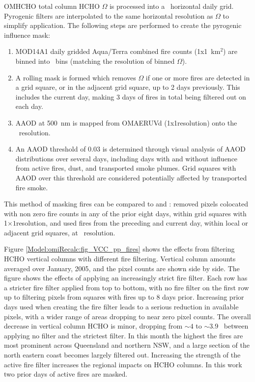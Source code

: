     OMHCHO total column HCHO $\Omega$ is processed into a \highhr ~horizontal daily grid.
    Pyrogenic filters are interpolated to the same horizontal resolution as $\Omega$ to simplify application. 
    The following steps are performed to create the pyrogenic influence mask:
    \begin{enumerate}
      \item MOD14A1 daily gridded Aqua/Terra combined fire counts (1x1~km$^2$) are binned into \highhr ~bins (matching the resolution of binned $\Omega$).
      \item A rolling mask is formed which removes $\Omega$ if one or more fires are detected in a grid square, or in the adjacent grid square, up to 2 days previously.
      This includes the current day, making 3 days of fires in total being filtered out on each day.
      \item AAOD at 500~nm is mapped from OMAERUVd (1x1\degr resolution) onto the \highhr ~resolution.
      \item An AAOD threshold of 0.03 is determined through visual analysis of AAOD distributions over several days, including days with and without influence from active fires, dust, and transported smoke plumes. 
      Grid squares with AAOD over this threshold are considered potentially affected by transported fire smoke.
    \end{enumerate}
    This method of masking fires can be compared to \textcite{Marais2012} and \textcite{Barkley2013}:
    \textcite{Marais2012} removed pixels colocated with non zero fire counts in any of the prior eight days, within grid squares with 1\degr$\times 1$\degr resolution, and \textcite{Barkley2013} used fires from the preceding and current day, within local or adjacent grid squares, at \highhr ~resolution.
    
    
    Figure \ref{Model:omiRecalc:fig_VCC_pp_fires} shows the effects from filtering HCHO vertical columns with different fire filtering.
    Vertical column amounts averaged over January, 2005, and the pixel counts are shown side by side.
    The figure shows the effects of applying an increasingly strict fire filter.
    Each row has a stricter fire filter applied from top to bottom, with no fire filter on the first row up to filtering pixels from squares with fires up to 8 days prior.
    Increasing prior days used when creating the fire filter leads to a serious reduction in available pixels, with a wider range of areas dropping to near zero pixel counts.
    The overall decrease in vertical column HCHO is minor, dropping from $\sim{4}$ to $\sim{3.9}$ \moleccm ~between applying no filter and the strictest filter.
    In this month the highest the fires are most prominent across Queensland and northern NSW, and a large section of the north eastern coast becomes largely filtered out.
    Increasing the strength of the active fire filter increases the regional impacts on HCHO columns.
    In this work two prior days of active fires are masked.
    
